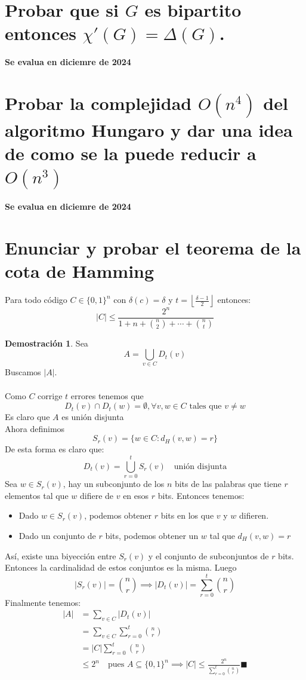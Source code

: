 \documentclass[11pt, a4paper]{article}
\theoremstyle{definition}
\newtheorem*{demostracion}{Demostración}
\begin{document}
\section{Probar que si $G$ es bipartito entonces $\chi'(G) = \Delta(G)$.}
\textbf{Se evalua en diciemre de 2024}

\section{Probar la complejidad $O(n^4)$ del algoritmo Hungaro y dar una idea de como se la puede reducir a $O(n^3)$}
\textbf{Se evalua en diciemre de 2024}

\section{Enunciar y probar el teorema de la cota de Hamming}

Para todo código $C \in \{0,1\}^n$ con $\delta(c)=\delta$ y $t=\left\lfloor\frac{\delta-1}{2}\right\rfloor$ entonces:
\[
|C| \leq \frac{2^n}{1 + n + \binom{n}{2} + \cdots + \binom{n}{t}}
\]
\begin{demostracion}
Sea
\[
A = \bigcup_{v \in C} D_t(v)
\]
Buscamos $|A|$.\\ \\
Como $C$ corrige $t$ errores tenemos que
\[
D_t(v) \cap D_t(w) = \emptyset, \forall v, w \in C \text{ tales que } v \neq w
\]
Es claro que $A$ es unión disjunta\\
Ahora definimos
\[
S_r(v) = \{w \in C : d_H(v, w) = r\}
\]
De esta forma es claro que:
\[
D_t(v) = \bigcup_{r=0}^t S_r(v) \quad \text{unión disjunta}
\]
Sea $w \in S_r(v)$, hay un subconjunto de los $n$ bits de las palabras que tiene $r$ elementos tal que $w$ difiere de $v$ en esos $r$ bits. Entonces tenemos:
\begin{itemize}
    \item Dado $w \in S_r(v)$, podemos obtener $r$ bits en los que $v$ y $w$ difieren.
    \item Dado un conjunto de $r$ bits, podemos obtener un $w$ tal que $d_H(v,w) = r$
\end{itemize}
Así, existe una biyección entre $S_r(v)$ y el conjunto de subconjuntos de $r$ bits. Entonces la cardinalidad de estos conjuntos es la misma. Luego
\[
|S_r(v)| = \binom{n}{r} \implies |D_t(v)| = \sum_{r=0}^t \binom{n}{r}
\]
Finalmente tenemos:
\begin{align*}
    |A| & = \sum_{v\in C} |D_t(v)| \\
        & = \sum_{v\in C} \sum_{r=0}^t \binom{n}{r} \\
        & = |C| \sum_{r=0}^t \binom{n}{r} \\
        & \leq 2^n \quad \text{pues } A \subseteq \{0,1\}^n \implies |C| \leq \frac{2^n}{\sum_{r=0}^t \binom{n}{r}} \blacksquare
\end{align*}
\end{demostracion}
\end{document}
